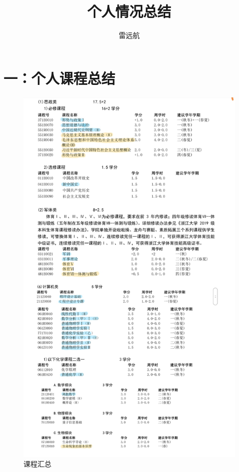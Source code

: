 \documentclass{article}
\title{个人情况总结}
\author{雷远航}
\begin{document}
\maketitle

\section*{一：个人课程总结}
    \begin{figure}[H]
	\centering
	\includegraphics[width=1\textwidth]{1.jpg}
	\caption{\label{总结}课程汇总}
	\end{figure}
\end{document}
